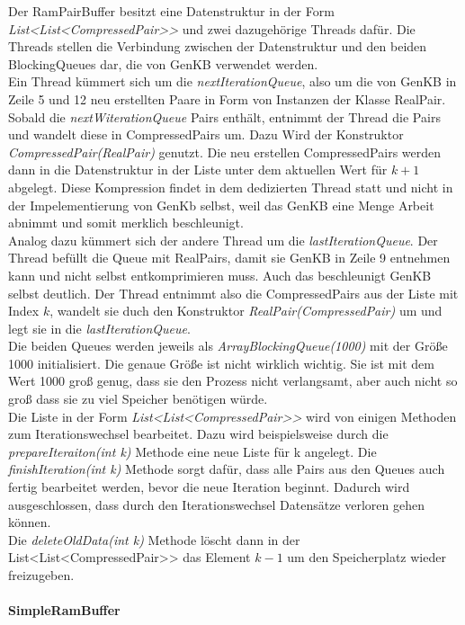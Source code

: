\documentclass[12pt,a4paper]{article}
\begin{document}
Der RamPairBuffer besitzt eine Datenstruktur in der Form \textit{List<List<CompressedPair>>} und zwei dazugehörige Threads dafür. Die Threads stellen die Verbindung zwischen der Datenstruktur und den beiden BlockingQueues dar, die von GenKB verwendet werden. \\
Ein Thread kümmert sich um die \textit{nextIterationQueue}, also um die von GenKB in Zeile 5 und 12  neu erstellten Paare in Form von Instanzen der Klasse RealPair. Sobald die \textit{nextWiterationQueue} Pairs enthält, entnimmt der Thread die Pairs und wandelt diese in CompressedPairs um. Dazu Wird der Konstruktor \textit{CompressedPair(RealPair)} genutzt. Die neu erstellen CompressedPairs werden dann in die Datenstruktur in der Liste unter dem aktuellen Wert für $k+1$ abgelegt. Diese Kompression findet in dem  dedizierten Thread statt und nicht in der Impelementierung von GenKb selbst, weil das GenKB eine Menge Arbeit abnimmt und somit merklich beschleunigt. \\
Analog dazu kümmert sich der andere Thread um die \textit{lastIterationQueue}. Der Thread befüllt die Queue mit RealPairs, damit sie GenKB in Zeile 9 entnehmen kann und nicht selbst entkomprimieren muss. Auch das beschleunigt GenKB selbst deutlich. Der Thread entnimmt also die CompressedPairs aus der Liste mit Index $k$, wandelt sie duch den Konstruktor \textit{RealPair(CompressedPair)} um und legt sie in die \textit{lastIterationQueue}. \\
Die beiden Queues werden jeweils als \textit{ArrayBlockingQueue(1000)} mit der Größe 1000 initialisiert. Die genaue Größe ist nicht wirklich wichtig. Sie ist mit dem Wert 1000 groß genug, dass sie den Prozess nicht verlangsamt, aber auch nicht so groß dass sie zu viel Speicher benötigen würde. \\
Die Liste in der Form \textit{List<List<CompressedPair>>} wird von einigen Methoden zum Iterationswechsel bearbeitet. Dazu wird beispielsweise durch die \textit{prepareIteraiton(int k)} Methode eine neue Liste für k angelegt. Die \textit{finishIteration(int k)} Methode sorgt dafür, dass alle Pairs aus den Queues auch fertig bearbeitet werden, bevor die neue Iteration beginnt. Dadurch wird ausgeschlossen, dass durch den Iterationswechsel Datensätze verloren gehen können. \\
Die \textit{deleteOldData(int k)} Methode löscht dann in der List<List<CompressedPair>> das Element $k-1$ um den Speicherplatz wieder freizugeben.


\paragraph{SimpleRamBuffer}\mbox{}
\label{sec:simplerambuffer}
\end{document}
